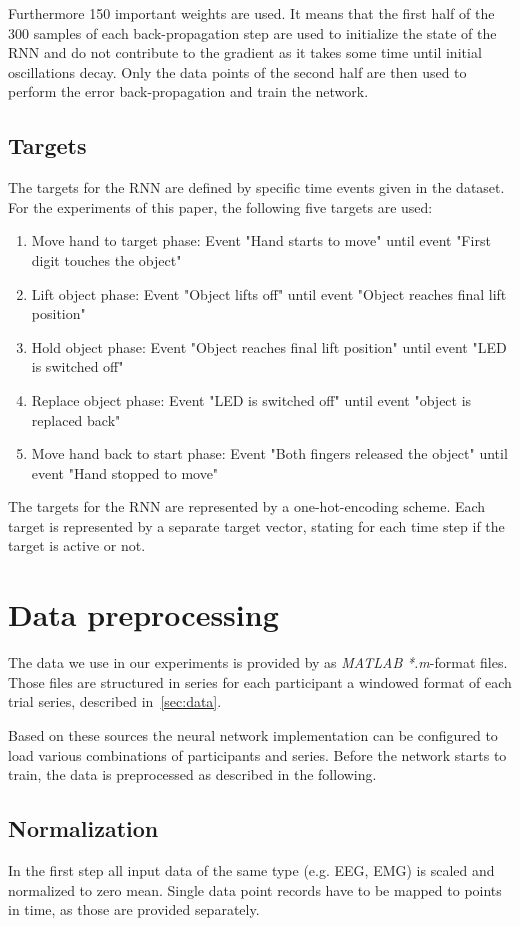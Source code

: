 \documentclass{article} %
\begin{document}
Furthermore 150 important weights are used.
It means that the first half of the 300 samples of each back-propagation step are used to initialize the state of the RNN and do not contribute to the gradient as it takes some time until initial oscillations decay.
Only the data points of the second half are then used to perform the error back-propagation and train the network.

\subsection{Targets}
The targets for the RNN are defined by specific time events given in the dataset. For the experiments of this paper, the following five targets are used:
\begin{enumerate}
	\item Move hand to target phase: Event "Hand starts to move"  until event "First digit touches the object"
	\item Lift object phase: Event "Object lifts off" until event "Object reaches final lift position"
	\item Hold object phase: Event "Object reaches final lift position" until event "LED is switched off"
	\item Replace object phase: Event "LED is switched off" until event "object is replaced back"
	\item Move hand back to start phase: Event "Both fingers released the object" until event "Hand stopped to move"
\end{enumerate}
The targets for the RNN are represented by a one-hot-encoding scheme.
Each target is represented by a separate target vector, stating for each time step if the target is active or not.

\section{Data preprocessing}
The data we use in our experiments is provided by \cite{nature} as \textit{MATLAB} \textit{*.m}-format files.
Those files are structured in series for each participant a windowed format of each trial series, described in~\ref{sec:data}.

Based on these sources the neural network implementation can be configured to load various combinations of participants and series.
Before the network starts to train, the data is preprocessed as described in the following.

\subsection{Normalization}
In the first step all input data of the same type (e.g. EEG, EMG) is scaled and normalized to zero mean.
Single data point records have to be mapped to points in time, as those are provided separately.
\end{document}
